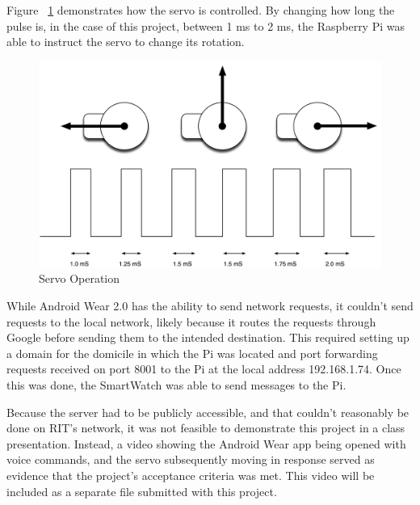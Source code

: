 \documentclass[a4paper]{article}
\begin{document}
Figure ~\ref{fig:servo} demonstrates how the servo is controlled.
By changing how long the pulse is, in the case of this project, between 1 ms to 2 ms, the Raspberry Pi was able to instruct the servo to change its rotation.
\begin{figure}[H]
    \center
    \label{fig:servo}
    \caption{Servo Operation}
    \includegraphics[width=12cm]{servoOperation.png}
\end{figure}

While Android Wear 2.0 has the ability to send network requests, it couldn't send requests to the local network, likely because it routes the requests through Google before sending them to the intended destination.
This required setting up a domain for the domicile in which the Pi was located and port forwarding requests received on port 8001 to the Pi at the local address 192.168.1.74.
Once this was done, the SmartWatch was able to send messages to the Pi.

Because the server had to be publicly accessible, and that couldn't reasonably be done on RIT's network, it was not feasible to demonstrate this project in a class presentation.
Instead, a video showing the Android Wear app being opened with voice commands, and the servo subsequently moving in response served as evidence that the project's acceptance criteria was met.
This video will be included as a separate file submitted with this project.
\end{document}
